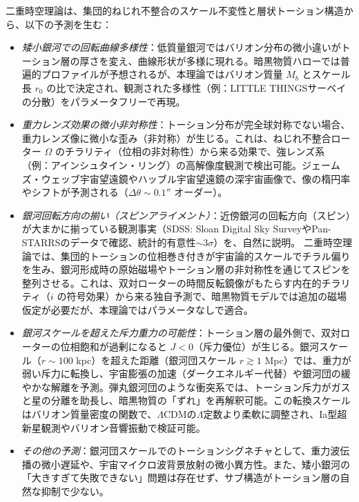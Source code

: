 \documentclass[dvipdfmx,a4paper]{jsbook}
\theoremstyle{definition}
\theoremstyle{remark}
\begin{document}
二重時空理論は、集団的ねじれ不整合のスケール不変性と層状トーション構造から、以下の予測を生む：
\begin{itemize}
  \item \emph{矮小銀河での回転曲線多様性}：低質量銀河ではバリオン分布の微小違いがトーション層の厚さを変え、曲線形状が多様に現れる。暗黒物質ハローでは普遍的プロファイルが予想されるが、本理論ではバリオン質量 $M_b$ とスケール長 $r_0$ の比で決定され、観測された多様性（例：LITTLE THINGSサーベイの分散）をパラメータフリーで再現。
  
  \item \emph{重力レンズ効果の微小非対称性}：トーション分布が完全球対称でない場合、重力レンズ像に微小な歪み（非対称）が生じる。これは、ねじれ不整合ローター $\Omega$ のチラリティ（位相の非対称性）から来る効果で、強レンズ系（例：アインシュタイン・リング）の高解像度観測で検出可能。ジェームズ・ウェッブ宇宙望遠鏡やハッブル宇宙望遠鏡の深宇宙画像で、像の楕円率やシフトが予測される（$\Delta \theta \sim 0.1''$ オーダー）。

  \item \emph{銀河回転方向の揃い（スピンアライメント）}：近傍銀河の回転方向（スピン）が大まかに揃っている観測事実（SDSS: Sloan Digital Sky SurveyやPan-STARRSのデータで確認、統計的有意性$\sim 3\sigma$）を、自然に説明。  
  二重時空理論では、集団的トーションの位相巻き付きが宇宙論的スケールでチラル偏りを生み、銀河形成時の原始磁場やトーション層の非対称性を通じてスピンを整列させる。これは、双対ローターの時間反転鏡像がもたらす内在的チラリティ（$i$ の符号効果）から来る独自予測で、暗黒物質モデルでは追加の磁場仮定が必要だが、本理論ではパラメータなしで適合。

  \item \emph{銀河スケールを超えた斥力重力の可能性}：トーション層の最外側で、双対ローターの位相飽和が過剰になると $J < 0$（斥力優位）が生じる。銀河スケール（$r \sim 100$ kpc）を超えた距離（銀河団スケール $r \gtrsim 1$ Mpc）では、重力が弱い斥力に転換し、宇宙膨張の加速（ダークエネルギー代替）や銀河団の緩やかな解離を予測。弾丸銀河団のような衝突系では、トーション斥力がガスと星の分離を助長し、暗黒物質の「ずれ」を再解釈可能。この転換スケールはバリオン質量密度の関数で、$\Lambda$CDMの$\Lambda$定数より柔軟に調整され、Ia型超新星観測やバリオン音響振動で検証可能。

  \item \emph{その他の予測}：銀河団スケールでのトーションシグネチャとして、重力波伝播の微小遅延や、宇宙マイクロ波背景放射の微小異方性。また、矮小銀河の「大きすぎて失敗できない」問題は存在せず、サブ構造がトーション層の自然な抑制で少ない。
\end{itemize}
\end{document}

